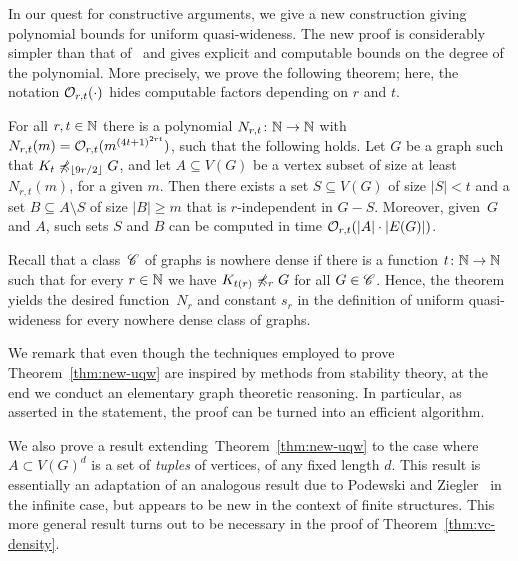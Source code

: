 \smallskip In our quest for constructive arguments, we give a new
construction giving polynomial bounds for uniform quasi-wideness.  The
new proof is considerably simpler than that
of~\cite{siebertz2016polynomial} and gives explicit and computable
bounds on the degree of the polynomial.  More precisely, we prove the
following theorem; here, the notation $\mathcal{O}_{r,t}(\cdot)$ hides
computable factors depending on $r$ and $t$.


\setcounter{uqw}{\value{theorem}}
\begin{theorem}\label{thm:new-uqw}
  For all $r,t\in \mathbb{N}$ there is a polynomial $N_{r,t}\colon \mathbb{N}\to \mathbb{N}$
  with $N_{r,t}(m)= \mathcal{O}_{r,t}{(m^{{(4t+1)}^{2rt}})}$, such that the
  following holds.  Let $G$ be a graph such that
  $K_t\not\preccurlyeq_{\lfloor 9r/2\rfloor} G$, and let $A\subseteq V(G)$
  be a vertex subset of size at least $N_{r,t}(m)$, for a given $m$.
  Then there exists a set $S\subseteq V(G)$ of size $|S|<t$ and a set
  $B\subseteq A\setminus S$ of size $|B|\geq m$ that is
  $r$-independent in $G-S$.  Moreover, given~$G$ and $A$, such sets
  $S$ and $B$ can be computed in time $\mathcal{O}_{r,t}(|A|\cdot |E(G)|)$.
\end{theorem}

Recall that a class~$\mathscr{C}$ of graphs is nowhere dense if there is a
function $t\colon \mathbb{N}\to \mathbb{N}$ such that for every $r\in \mathbb{N}$ we have
$K_{t(r)}\not\preccurlyeq_r G$ for all $G\in \mathscr{C}$.  Hence, the theorem
yields the desired function~$N_r$ and constant $s_r$ in the definition
of uniform quasi-wideness for every nowhere dense class of graphs.

We remark that even though the techniques employed to prove
Theorem~\ref{thm:new-uqw} are inspired by methods from stability
theory, at the end we conduct an elementary graph theoretic
reasoning. In particular, as asserted in the statement, the proof can
be turned into an efficient algorithm.

We also prove a result extending~Theorem~\ref{thm:new-uqw} to the case
where $A\subset V(G)^d$ is a set of \emph{tuples} of vertices, of any
fixed length $d$.  This result is essentially an adaptation of an
analogous result due to Podewski and Ziegler~\cite{podewski1978stable}
in the infinite case, but appears to be new in the context of finite
structures.  This more general result turns out to be necessary in the
proof of Theorem~\ref{thm:vc-density}.

